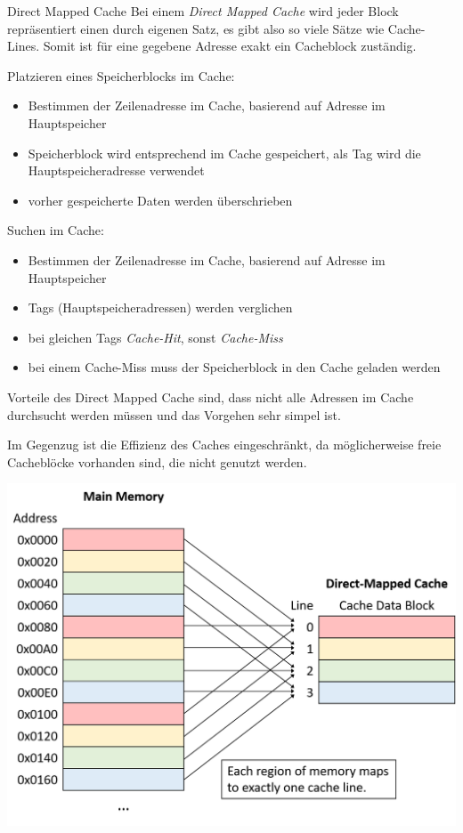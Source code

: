 \begin{defi}{Direct Mapped Cache}
    Bei einem \emph{Direct Mapped Cache} wird jeder Block repräsentiert einen durch eigenen Satz, es gibt also so viele Sätze wie Cache-Lines.
    Somit ist für eine gegebene Adresse exakt ein Cacheblock zuständig.
    
    Platzieren eines Speicherblocks im Cache:
    \begin{itemize}
        \item Bestimmen der Zeilenadresse im Cache, basierend auf Adresse im Hauptspeicher
        \item Speicherblock wird entsprechend im Cache gespeichert, als Tag wird die Hauptspeicheradresse verwendet
        \item vorher gespeicherte Daten werden überschrieben
    \end{itemize}
    
    Suchen im Cache:
    \begin{itemize}
        \item Bestimmen der Zeilenadresse im Cache, basierend auf Adresse im Hauptspeicher
        \item Tags (Hauptspeicheradressen) werden verglichen
        \item bei gleichen Tags \emph{Cache-Hit}, sonst \emph{Cache-Miss}
        \item bei einem Cache-Miss muss der Speicherblock in den Cache geladen werden
    \end{itemize}
    
    Vorteile des Direct Mapped Cache sind, dass nicht alle Adressen im Cache durchsucht werden müssen und das Vorgehen sehr simpel ist.
    
    Im Gegenzug ist die Effizienz des Caches eingeschränkt, da möglicherweise freie Cacheblöcke vorhanden sind, die nicht genutzt werden.
    
    \centering
    \includegraphics[width=.6\linewidth]{images/direct_mapped_cache.png}
\end{defi}

